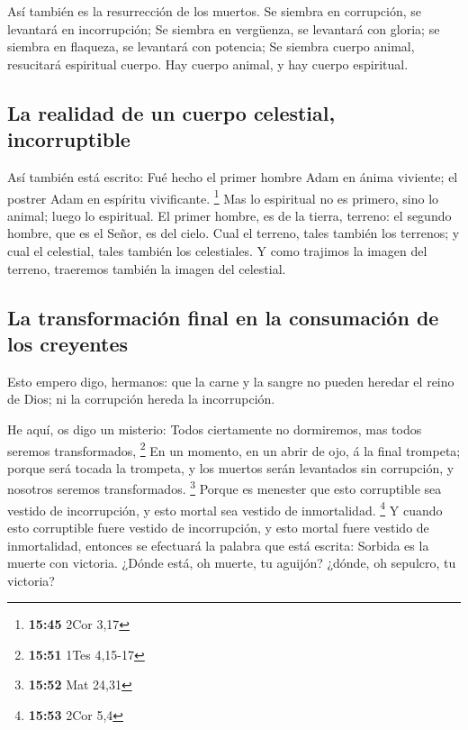  Así también es la resurrección de los muertos. Se
siembra en corrupción, se levantará en incorrupción;  Se
siembra en vergüenza, se levantará con gloria; se siembra en flaqueza,
se levantará con potencia;  Se siembra cuerpo animal,
resucitará espiritual cuerpo. Hay cuerpo animal, y hay cuerpo
espiritual.

\hypertarget{la-realidad-de-un-cuerpo-celestial-incorruptible}{%
\subsection{La realidad de un cuerpo celestial,
incorruptible}\label{la-realidad-de-un-cuerpo-celestial-incorruptible}}

 Así también está escrito: Fué hecho el primer hombre
Adam en ánima viviente; el postrer Adam en espíritu vivificante.
\footnote{\textbf{15:45} 2Cor 3,17}  Mas lo espiritual no
es primero, sino lo animal; luego lo espiritual.  El
primer hombre, es de la tierra, terreno: el segundo hombre, que es el
Señor, es del cielo.  Cual el terreno, tales también los
terrenos; y cual el celestial, tales también los celestiales.
 Y como trajimos la imagen del terreno, traeremos también
la imagen del celestial.

\hypertarget{la-transformaciuxf3n-final-en-la-consumaciuxf3n-de-los-creyentes}{%
\subsection{La transformación final en la consumación de los
creyentes}\label{la-transformaciuxf3n-final-en-la-consumaciuxf3n-de-los-creyentes}}

 Esto empero digo, hermanos: que la carne y la sangre no
pueden heredar el reino de Dios; ni la corrupción hereda la
incorrupción.

 He aquí, os digo un misterio: Todos ciertamente no
dormiremos, mas todos seremos transformados, \footnote{\textbf{15:51}
  1Tes 4,15-17}  En un momento, en un abrir de ojo, á la
final trompeta; porque será tocada la trompeta, y los muertos serán
levantados sin corrupción, y nosotros seremos transformados. \footnote{\textbf{15:52}
  Mat 24,31}  Porque es menester que esto corruptible sea
vestido de incorrupción, y esto mortal sea vestido de inmortalidad.
\footnote{\textbf{15:53} 2Cor 5,4}  Y cuando esto
corruptible fuere vestido de incorrupción, y esto mortal fuere vestido
de inmortalidad, entonces se efectuará la palabra que está escrita:
Sorbida es la muerte con victoria.  ¿Dónde está, oh
muerte, tu aguijón? ¿dónde, oh sepulcro, tu victoria?

